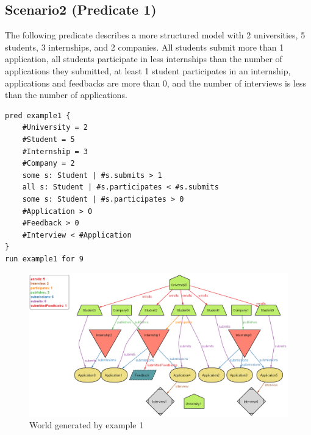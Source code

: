 \subsection{Scenario2 (Predicate 1)}
The following predicate describes a more structured model with 2 universities, 5 students, 3 internships, and 2 companies.
All students submit more than 1 application, all students participate in less internships than the number of applications they submitted,
at least 1 student participates in an internship, applications and feedbacks are more than 0, and the number of interviews is less than the 
number of applications.
\begin{lstlisting}
pred example1 {
    #University = 2
    #Student = 5
    #Internship = 3
    #Company = 2
    some s: Student | #s.submits > 1
    all s: Student | #s.participates < #s.submits
    some s: Student | #s.participates > 0
    #Application > 0
    #Feedback > 0
    #Interview < #Application
} 
run example1 for 9
\end{lstlisting}
\begin{figure}[H]
    \centering
    \includegraphics[width=1\textwidth]{Images/Alloy/example1.png}
    \caption{World generated by example 1}\label{fig:example1}
\end{figure}

